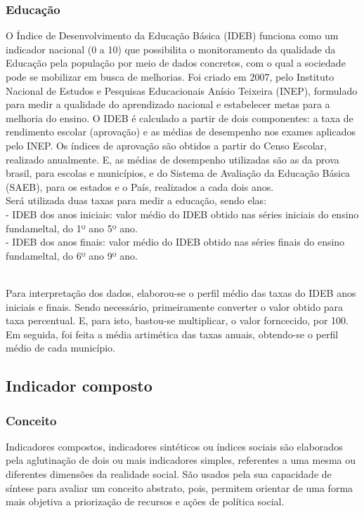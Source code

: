 \documentclass[a4paper, 10pt]{article}
\begin{document}
	
 \subsubsection{Educação}
  O Índice de Desenvolvimento da Educação Básica (IDEB) funciona como um indicador nacional (0 a 10) que possibilita o monitoramento da qualidade da Educação pela população por meio de dados concretos, com o qual a sociedade pode se mobilizar em busca de melhorias. Foi criado em 2007, pelo Instituto Nacional de Estudos e Pesquisas Educacionais Anísio Teixeira (INEP), formulado para medir a qualidade do aprendizado nacional e estabelecer metas para a melhoria do ensino. O IDEB é calculado a partir de dois componentes: a taxa de rendimento escolar (aprovação) e as médias de desempenho nos exames aplicados pelo INEP. Os índices de aprovação são obtidos a partir do Censo Escolar, realizado anualmente. E, as médias de desempenho utilizadas são as da prova brasil, para escolas e municípios, e do Sistema de Avaliação da Educação Básica (SAEB), para os estados e o País, realizados a cada dois anos. 
  \\
  
  Será utilizada duas taxas para medir a educação, sendo elas:
  \\
 \noindent
 - IDEB dos anos iniciais: valor médio do IDEB obtido nas séries iniciais do ensino fundameltal, do 1º ano 5º ano.
 \\
 - IDEB dos anos finais: valor médio do IDEB obtido nas séries finais do ensino fundameltal, do 6º ano 9º ano.
 
 \\
Para interpretação dos dados, elaborou-se o perfil médio das taxas do IDEB anos iniciais e finais. Sendo necessário, primeiramente converter o valor obtido para taxa percentual. E, para isto, bastou-se multiplicar, o valor forncecido, por 100. Em seguida, foi feita a média artimética das taxas anuais, obtendo-se o perfil médio de cada município.
 
 \subsection{Indicador composto}
 \subsubsection{Conceito}
 Indicadores compostos, indicadores sintéticos ou índices sociais são elaborados pela aglutinação de dois ou mais indicadores simples, referentes a uma mesma ou diferentes dimensões da realidade social. São usados pela sua capacidade de síntese para avaliar um conceito abstrato, pois, permitem orientar de uma forma mais objetiva a priorização de recursos e ações de política social.
 
\end{document}
